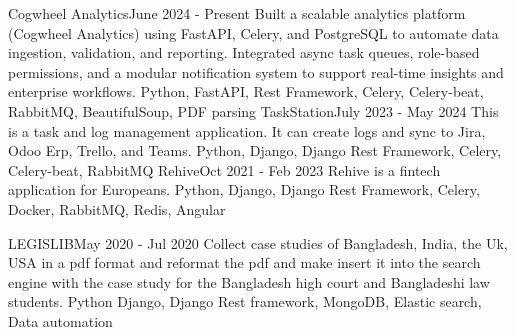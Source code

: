 %
%
%

\begin{projects}
    \project
        {Cogwheel Analytics}{June 2024 - Present}
        {\website{}{}}
        {Built a scalable analytics platform (Cogwheel Analytics) using FastAPI, Celery, and PostgreSQL to automate data ingestion, validation, and reporting. Integrated async task queues, role-based permissions, and a modular notification system to support real-time insights and enterprise workflows.}
        {Python, FastAPI, Rest Framework, Celery, Celery-beat, RabbitMQ, BeautifulSoup, PDF parsing}
    \project
        {TaskStation}{July 2023 - May 2024}
        {}
        {This is a task and log management application. It can create logs and sync to Jira, Odoo Erp, Trello, and Teams.}
        {Python, Django, Django Rest Framework, Celery, Celery-beat, RabbitMQ}
    \project
	{Rehive}{Oct 2021 - Feb 2023}
	{}
	{Rehive is a fintech application for Europeans.}
	{Python, Django, Django Rest Framework, Celery, Docker, RabbitMQ, Redis, Angular}
 
    
    \project
    {LEGISLIB}{May 2020 - Jul 2020}
    {}
    {Collect case studies of Bangladesh, India, the Uk, USA in a pdf format and reformat the pdf and make insert it into the search engine with the case study for the Bangladesh high court and Bangladeshi law students.}
    {Python Django, Django Rest framework, MongoDB, Elastic search, Data automation}

\end{projects}